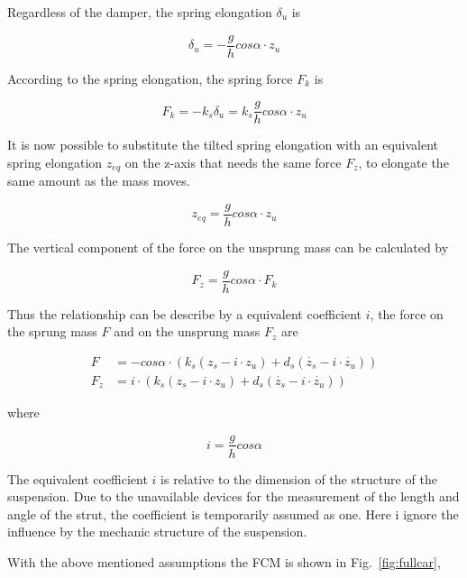 Regardless of the damper, the spring elongation $\delta_u$ is

\begin{equation}
    \delta_u = -\frac{g}{h} cos\alpha \cdot z_u
\end{equation}

According to the spring elongation, the spring force $F_k$ is

\begin{equation}
    F_k = -k_s\delta_u = k_s\frac{g}{h} cos\alpha \cdot z_u
\end{equation}

It is now possible to substitute the tilted spring elongation with an equivalent spring elongation $z_{eq}$ on the z-axis that needs the same force $F_z$, to elongate the same amount as the mass moves.
%

\begin{equation}
    z_{eq} = \frac{g}{h} cos\alpha \cdot z_u
\end{equation}

The vertical component of the force on the unsprung mass can be calculated by

\begin{equation}
    F_z = \frac{g}{h} cos\alpha \cdot F_k
\end{equation}

Thus the relationship can be describe by a equivalent coefficient $i$, the force on the sprung mass $F$ and on the unsprung mass $F_z$ are

\begin{align}
    F &= -cos\alpha \cdot (k_s(z_s - i\cdot z_u)+d_s(\dot{z_s}-i\cdot \dot{z_u})) \\
    F_z &= i\cdot (k_s(z_s - i\cdot z_u)+d_s(\dot{z_s}-i\cdot \dot{z_u}))
\end{align}

where

\begin{equation}
    i = \frac{g}{h} cos\alpha
\end{equation}

The equivalent coefficient $i$ is relative to the dimension of the structure of the suspension.
%
Due to the unavailable devices for the measurement of the length and angle of the strut, the coefficient is temporarily assumed as one.
%
Here i ignore the influence by the mechanic structure of the suspension.

With the above mentioned assumptions the \ac{FCM} is shown in Fig.~\ref{fig:fullcar},

